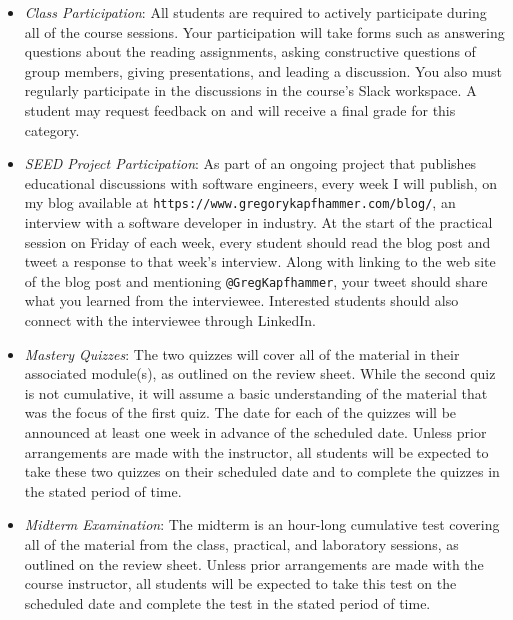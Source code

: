\documentclass[11pt]{article}
\newcommand{\url}[1]{\lstinline{#1}}
\begin{document}
\begin{itemize}

  \item {\em Class Participation\/}: All students are required to actively
    participate during all of the course sessions. Your participation will take
    forms such as answering questions about the reading assignments, asking
    constructive questions of group members, giving presentations, and leading a
    discussion. You also must regularly participate in the discussions in the
    course's Slack workspace. A student may request feedback on and will receive a
    final grade for this category.

  \item {\em SEED Project Participation\/}: As part of an ongoing project that
    publishes educational discussions with software engineers, every week I will
    publish, on my blog available at
    \url{https://www.gregorykapfhammer.com/blog/}, an interview with a software
    developer in industry. At the start of the practical session on Friday of
    each week, every student should read the blog post and tweet a response to
    that week's interview. Along with linking to the web site of the blog post
    and mentioning \url{@GregKapfhammer}, your tweet should share what you
    learned from the interviewee. Interested students should also connect with
    the interviewee through LinkedIn.

  \item {\em Mastery Quizzes\/}: The two quizzes will cover all of the material
    in their associated module(s), as outlined on the review sheet. While the
    second quiz is not cumulative, it will assume a basic understanding of the
    material that was the focus of the first quiz. The date for each of the
    quizzes will be announced at least one week in advance of the scheduled
    date. Unless prior arrangements are made with the instructor, all students
    will be expected to take these two quizzes on their scheduled date and to
    complete the quizzes in the stated period of time.

  \item {\em Midterm Examination\/}: The midterm is an hour-long cumulative test
    covering all of the material from the class, practical, and laboratory
    sessions, as outlined on the review sheet. Unless prior arrangements are
    made with the course instructor, all students will be expected to take this
    test on the scheduled date and complete the test in the stated period of
    time.


\end{itemize}
\end{document}
